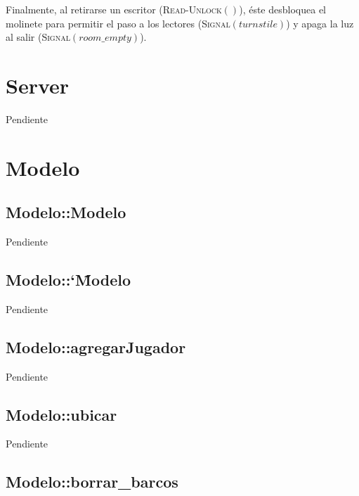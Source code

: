 \documentclass[a4paper,10pt,twoside]{article}
\newcommand{\Fn}[2]{\textsc{#1}$(#2)$}
\begin{document}
Finalmente, al retirarse un escritor (\Fn{Read-Unlock}{}), éste desbloquea el molinete para permitir el paso a los lectores (\Fn{Signal}{turnstile}) y apaga la luz al salir (\Fn{Signal}{room\_empty}). 



\section{Server}

Pendiente




\section{Modelo}


\subsection{Modelo::Modelo}

Pendiente


\subsection{Modelo::\char`\~Modelo}

Pendiente


\subsection{Modelo::agregarJugador}

Pendiente


\subsection{Modelo::ubicar}

Pendiente


\subsection{Modelo::borrar\_barcos}
\end{document}
